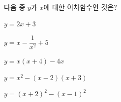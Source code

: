 다음 중 $y$가 $x$에 대한 이차함수인 것은?
\begin{choicesv}{\rule[-3ex]{0pt}{8ex}$y=2x+3$}{\rule[-3ex]{0pt}{8ex}$y=x-\dfrac{1}{x^2}+5$}{\rule[-3ex]{0pt}{8ex}$y=x(x+4)-4x$}{\rule[-3ex]{0pt}{8ex}$y=x^2-(x-2)(x+3)$}{\rule[-3ex]{0pt}{8ex}$y=(x+2)^2-(x-1)^2$}\end{choicesv}
